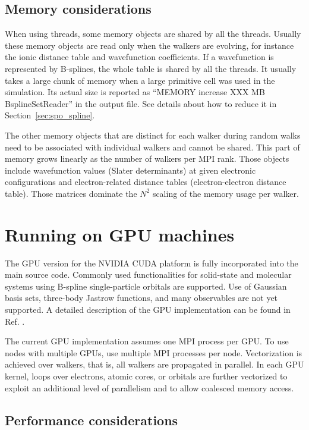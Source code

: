 \subsection{Memory considerations}
When using threads, some memory objects are shared by all the threads. Usually these memory objects are read only when the walkers are evolving, for instance the ionic distance table and wavefunction coefficients.
If a wavefunction is represented by B-splines, the whole table is shared by all the threads. It usually takes a large chunk of memory when a large primitive cell was used in the simulation. Its actual size is reported as ``MEMORY increase XXX MB BsplineSetReader'' in the output file.
See details about how to reduce it in Section~\ref{sec:spo_spline}.

The other memory objects that are distinct for each walker during random walks need to be associated with individual walkers and cannot be shared. This part of memory grows linearly as the number of walkers per MPI rank. Those objects include wavefunction values (Slater determinants) at given electronic configurations and electron-related distance tables (electron-electron distance table). Those matrices dominate the $N^2$ scaling of the memory usage per walker.

\section{Running on GPU machines}
\label{sec:gpurunning}

The GPU version for the NVIDIA CUDA platform is fully incorporated into
the main source code. Commonly used functionalities for
solid-state and molecular systems using B-spline single-particle
orbitals are supported. Use of Gaussian basis sets, three-body
Jastrow functions, and many observables are not yet supported. A detailed description of the GPU
implementation can be found in Ref. \cite{EslerKimCeperleyShulenburger2012}.

The current GPU implementation assumes one MPI process per GPU. To use
nodes with multiple GPUs, use multiple MPI processes per node.
Vectorization is achieved over walkers, that is, all walkers are
propagated in parallel. In each GPU kernel, loops over electrons,
atomic cores, or orbitals are further vectorized to exploit an
additional level of parallelism and to allow coalesced memory access.


\subsection{Performance considerations}
\label{sec:gpu:performance}

